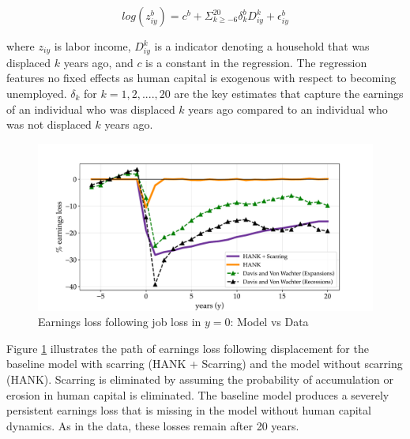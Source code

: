 $$
log(z_{iy}^{b}) = c^{b} + \Sigma_{k\geq -6}^{20}  \delta_{k}^{b} D_{iy}^{k} + \epsilon_{iy}^{b}
$$  

where $z_{iy}$ is labor income, $D_{iy}^{k}$ is a indicator denoting a household that was displaced $k$ years ago, and $c$ is a constant in the regression. The regression features no fixed effects as human capital is exogenous with respect to becoming unemployed.  $\delta_{k}$ for $k = 1, 2, ....,20$ are the key estimates that capture the earnings of an individual who was displaced $k$ years ago compared to an individual who was not displaced $k$ years ago. 
\begin{figure}[H]
    \centering
     \includegraphics[scale=.65]{text/chapter1/Figures/Scarring_match}
      \caption{Earnings loss following job loss in $y=0$: Model vs Data}
 \label{Scar_match_PE}
\end{figure}
Figure \ref{Scar_match_PE}  illustrates the path of earnings loss following displacement for the baseline model with scarring (HANK + Scarring) and the model without scarring (HANK). Scarring is eliminated by assuming the probability of accumulation or erosion in human capital is eliminated. The baseline model produces a severely persistent earnings loss that is missing in the model without human capital dynamics. As in the data, these losses remain after 20 years. 

